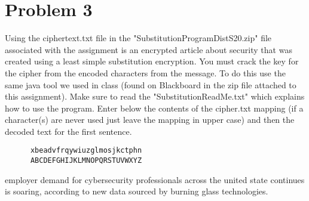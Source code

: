 \documentclass{article}
\newenvironment{problem}[1]{
  \nobreak\section*{Problem #1}
}{}
\begin{document}
  \begin{problem}{3}
    Using the ciphertext.txt file in the "SubstitutionProgramDistS20.zip" file associated
    with the assignment is an encrypted article about security that was created using a 
    least simple substitution encryption.  You must crack the key for the cipher from the 
    encoded characters from the message.  To do this use the same java tool we used in 
    class (found on Blackboard in the zip file attached to this assignment).  Make sure to 
    read the "SubstitutionReadMe.txt" which explains how to use the program.  Enter below 
    the contents of the cipher.txt mapping (if a character(s) are never used just leave 
    the mapping in upper case) and then the decoded text for the first sentence.
  \end{problem}
  \begin{center}
    \begin{lstlisting}
      xbeadvfrqywiuzglmosjkctphn
      ABCDEFGHIJKLMNOPQRSTUVWXYZ
    \end{lstlisting}
  \end{center}
  employer demand for cybersecurity professionals across the united state continues is 
  soaring, according to new data sourced by burning glass technologies.
\end{document}
